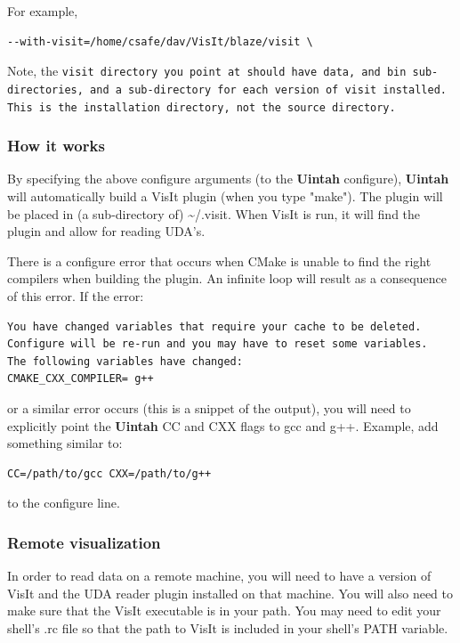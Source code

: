 \documentclass[12pt]{article}
\begin{document}
For example,

\begin{verbatim}
--with-visit=/home/csafe/dav/VisIt/blaze/visit \
\end{verbatim}

Note, the \tt visit \normalfont directory you point at should
have \tt data\normalfont , and \tt bin \normalfont sub-directories,
and a sub-directory for each version of visit installed.  This is the
installation directory, not the source directory.

\subsubsection{How it works}
By specifying the above configure arguments (to the \textbf{Uintah}
configure), \textbf{Uintah} will automatically build a VisIt plugin
(when you type "make"). The plugin will be placed in (a sub-directory
of) \textasciitilde/.visit. When VisIt is run, it will find the plugin
and allow for reading UDA's.


There is a configure error that occurs when CMake is unable to find the
right compilers when building the plugin.  An infinite loop will result
as a consequence of this error.  If the error:

\begin{verbatim}
You have changed variables that require your cache to be deleted.
Configure will be re-run and you may have to reset some variables.
The following variables have changed:
CMAKE_CXX_COMPILER= g++
\end{verbatim}

\noindent or a similar error occurs (this is a snippet of the output), you will 
need to explicitly point the \textbf{Uintah} CC and CXX flags to gcc 
and g++.  Example, add something similar to:

\begin{verbatim}
CC=/path/to/gcc CXX=/path/to/g++
\end{verbatim}

\noindent to the configure line. 

\subsubsection{Remote visualization}
In order to read data on a remote machine, you will need to have a
version of VisIt and the UDA reader plugin installed on that
machine. You will also need to make sure that the VisIt executable is
in your path. You may need to edit your shell's .rc file so that the
path to VisIt is included in your shell's PATH variable.
\end{document}
